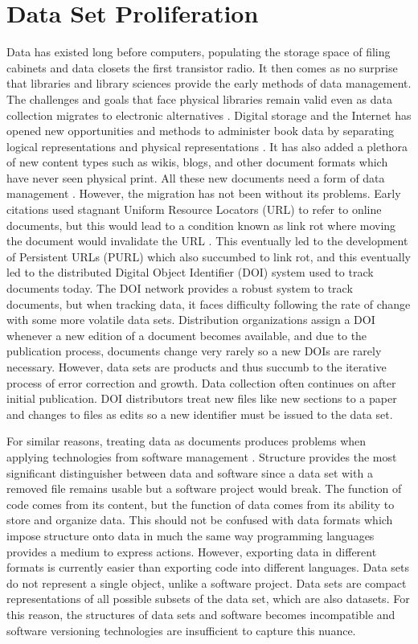 \section{Data Set Proliferation}

Data has existed long before computers, populating the storage space of filing cabinets and data closets the first transistor radio.
It then comes as no surprise that libraries and library sciences provide the early methods of data management.
The challenges and goals that face physical libraries remain valid even as data collection migrates to electronic alternatives \cite{rohtua}.
Digital storage and the Internet has opened new opportunities and methods to administer book data by separating logical representations and physical representations \cite{Barkstrom_digitallibrary}.
It has also added a plethora of new content types such as wikis, blogs, and other document formats which have never seen physical print.
All these new documents need a form of data management \cite{Berberich:2007:TMT:1277741.1277831}.
However, the migration has not been without its problems.
Early citations used stagnant Uniform Resource Locators (URL) to refer to online documents, but this would lead to a condition known as link rot where moving the document would invalidate the URL \cite{Lyons2005}.
This eventually led to the development of Persistent URLs (PURL) which also succumbed to link rot, and this eventually led to the distributed Digital Object Identifier (DOI) system used to track documents today.
The DOI network provides a robust system to track documents, but when tracking data, it faces difficulty following the rate of change with some more volatile data sets.
Distribution organizations assign a DOI whenever a new edition of a document becomes available, and due to the publication process, documents change very rarely so a new DOIs are rarely necessary.
However, data sets are products and thus succumb to the iterative process of error correction and growth.
Data collection often continues on after initial publication.
DOI distributors treat new files like new sections to a paper and changes to files as edits so a new identifier must be issued to the data set.

For similar reasons, treating data as documents produces problems when applying technologies from software management \cite{tichy1985rcs}\cite{Chien:2000:VMX:646544.696357}.
Structure provides the most significant distinguisher between data and software since a data set with a removed file remains usable but a software project would break.
The function of code comes from its content, but the function of data comes from its ability to store and organize data.
This should not be confused with data formats which impose structure onto data in much the same way programming languages provides a medium to express actions.
However, exporting data in different formats is currently easier than exporting code into different languages.
Data sets do not represent a single object, unlike a software project\cite{Chacon:2009:PG:1618548}.
Data sets are compact representations of all possible subsets of the data set, which are also datasets.
For this reason, the structures of data sets and software becomes incompatible and software versioning technologies are insufficient to capture this nuance.

